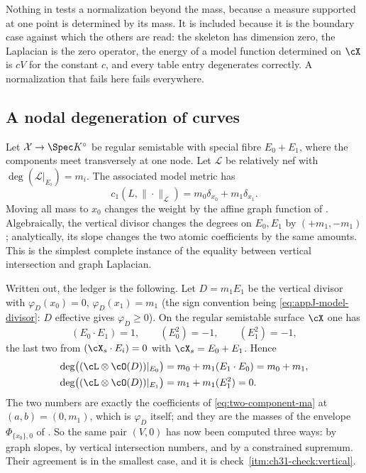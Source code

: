 \begin{remark}
\label{rem:ch31-good-reduction-scope}
Nothing in  tests a normalization beyond the
mass, because a measure supported at one point is determined by its mass.
It is included because it is the boundary case against which the others are
read: the skeleton has dimension zero, the Laplacian is the zero operator,
the energy of a model function determined on $\cX$ is $cV$ for the
constant $c$, and every table entry degenerates correctly.  A
normalization that fails here fails everywhere.
\end{remark}

\subsection{A nodal degeneration of curves}
\label{sec:ch31-nodal}

Let $\mathcal X\to\Spec K^\circ$ be regular semistable with special fibre
$E_0+E_1$, where the components meet transversely at one node.  Let
$\mathcal L$ be relatively nef with
$\deg(\mathcal L|_{E_i})=m_i$.  The associated model metric has
\begin{equation}
                   c_1(L,\|\cdot\|_{\mathcal L})
                   =m_0\delta_{x_0}+m_1\delta_{x_1}.
\label{eq:nodal-reference-measure}
\end{equation}
Moving all mass to $x_0$ changes the weight by the affine graph function
of .  Algebraically, the vertical
divisor changes the degrees on $E_0,E_1$ by $(+m_1,-m_1)$; analytically,
its slope changes the two atomic coefficients by the same amounts.  This is
the simplest complete instance of the equality between vertical
intersection and graph Laplacian.

Written out, the ledger is the following.  Let
$D=m_1E_1$ be the vertical divisor with $\varphi_D(x_0)=0$,
$\varphi_D(x_1)=m_1$ (the sign convention being
\eqref{eq:appJ-model-divisor}: $D$ effective gives
$\varphi_D\geq0$).  On the regular semistable surface $\cX$ one has
\[
 (E_0\cdot E_1)=1,\qquad
 (E_0^2)=-1,\qquad (E_1^2)=-1,
\]
the last two from $(\cX_s\cdot E_i)=0$ with $\cX_s=E_0+E_1$.  Hence
\begin{equation}
\label{eq:ch31-nodal-ledger}
 \begin{aligned}
 \deg\bigl((\cL\otimes\cO(D))|_{E_0}\bigr)
  &=m_0+m_1(E_1\cdot E_0)=m_0+m_1,\\
 \deg\bigl((\cL\otimes\cO(D))|_{E_1}\bigr)
  &=m_1+m_1(E_1^2)=0 .
 \end{aligned}
\end{equation}
The two numbers are exactly the coefficients of
\eqref{eq:two-component-ma} at $(a,b)=(0,m_1)$, which is
$\varphi_D$ itself; and they are the masses of the envelope
$\Phi_{\{x_0\},0}$ of .  So the same pair
$(V,0)$ has now been computed three ways: by graph slopes, by vertical
intersection numbers, and by a constrained supremum.  Their agreement is
 in the smallest case, and it is
check~\cref{itm:ch31-check:vertical}.

